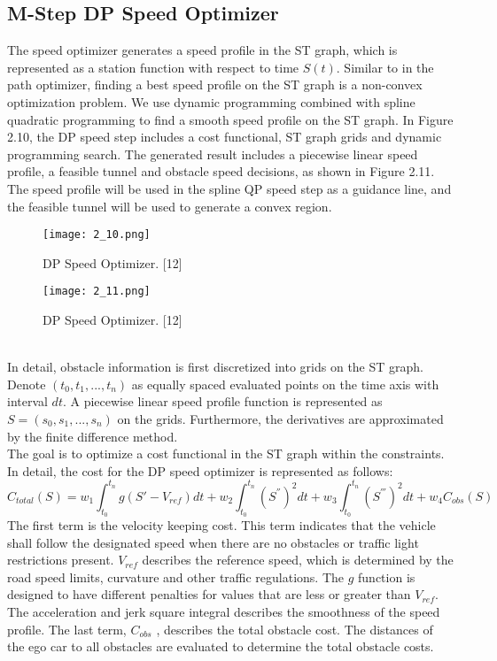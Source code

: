 \documentclass{thesisreport}
\begin{document}
\subsection{M-Step DP Speed Optimizer}
The speed optimizer generates a speed profile in the ST graph, which is represented as a station function with respect to time $S(t)$. Similar to in the path optimizer, finding a best speed profile on the ST graph is a non-convex optimization problem. We use dynamic programming combined with spline
quadratic programming to find a smooth speed
profile on the ST graph. In Figure 2.10, the DP speed step includes a cost functional, ST graph grids and dynamic programming search. The generated result includes a piecewise linear speed profile, a feasible tunnel and obstacle speed decisions, as shown in Figure 2.11. The speed profile will be used in the spline QP speed step as a guidance line, and the feasible tunnel will be used to generate a convex region.
  \begin{figure}[ht]
	\centering
	\texttt{[image: 2\_10.png]}
	\caption{DP Speed Optimizer. [12]}
	\label{fig:2.10} 
\end{figure}
  \begin{figure}[ht]
	\centering
	\texttt{[image: 2\_11.png]}
	\caption{DP Speed Optimizer. [12]}
	\label{fig:2.11} 
\end{figure}\\
\indent
In detail, obstacle information is first discretized into grids on the ST graph. Denote $(t_0 , t_1 , ..., t_n)$ as equally spaced evaluated points on the time axis with interval $dt$. A piecewise linear speed profile function is represented as $S = (s_0, s_1 , ..., s_n )$ on the grids. Furthermore, the derivatives are approximated by the finite difference method.\\
\indent
The goal is to optimize a cost functional in the ST graph within the constraints. In detail, the cost for the DP speed optimizer is represented as follows:
\begin{equation}
C_{total}(S) = w_1 \int_{t_0}^{t_n} g(S' - V_{ref})dt + w_2 \int_{t_0}^{t_n}(S^{''})^2dt + w_3 \int_{t_0}^{t_n} (S^{'''})^2dt + w_4 C_{obs}(S)
\end{equation}
The first term is the velocity keeping cost. This term indicates that the vehicle shall follow the designated speed when there are no obstacles or traffic light restrictions present. $V_{ref}$ describes the reference speed, which is determined by the road speed limits, curvature and other traffic regulations. The $g$ function is designed to have different penalties for values that are less or greater than $V_{ref}$. The acceleration and jerk square integral describes the smoothness of the speed profile. The last term, $C_{obs}$ , describes the total obstacle cost. The distances of the ego car to all obstacles are evaluated to determine the total obstacle costs.\\
\end{document}
